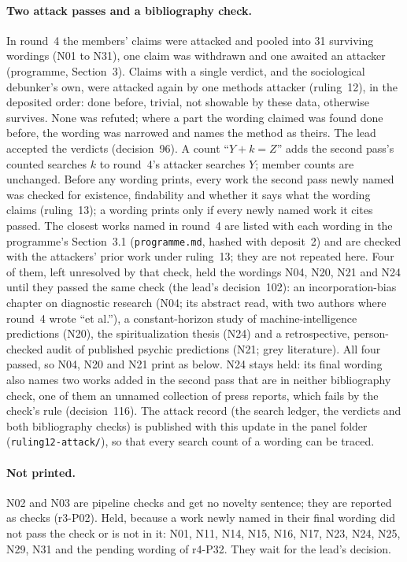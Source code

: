 \paragraph{Two attack passes and a bibliography check.} In round~4 the members' claims were attacked and pooled into 31
surviving wordings (N01 to N31), one claim was withdrawn and one awaited an attacker (programme, Section~3). Claims with
a single verdict, and the sociological debunker's own, were attacked again by one methods attacker (ruling~12), in the
deposited order: done before, trivial, not showable by these data, otherwise survives. None was refuted; where a part
the wording claimed was found done before, the wording was narrowed and names the method as theirs. The lead accepted
the verdicts (decision~96). A count ``$Y + k = Z$'' adds the second pass's counted searches $k$ to round~4's attacker
searches $Y$; member counts are unchanged. Before any wording prints, every work the second pass newly named was checked
for existence, findability and whether it says what the wording claims (ruling~13); a wording prints only if every newly
named work it cites passed. The closest works named in round~4 are listed with each wording in the programme's
Section~3.1 (\texttt{programme.md}, hashed with deposit~2) and are checked with the attackers' prior work under
ruling~13; they are not repeated here. Four of
them, left unresolved by that check, held the wordings N04, N20, N21 and N24 until they passed the same check (the lead's
decision~102): an incorporation-bias chapter on diagnostic research (N04; its abstract read, with two authors where
round~4 wrote ``et al.''), a constant-horizon study of machine-intelligence predictions (N20), the spiritualization
thesis (N24) and a retrospective, person-checked audit of published psychic predictions (N21; grey literature). All four
passed, so N04, N20 and N21 print as below. N24 stays held: its final wording also names two works added in the second
pass that are in neither bibliography check, one of them an unnamed collection of press reports, which fails by the
check's rule (decision~116). The attack record (the search ledger, the verdicts and both bibliography
checks) is published with this update in the panel folder (\texttt{ruling12-attack/}), so that every search count of a
wording can be traced.

\paragraph{Not printed.} N02 and N03 are pipeline checks and get no novelty sentence; they are reported as checks
(r3-P02). Held, because a work newly named in their final wording did not pass the check or is not in it: N01, N11,
N14, N15, N16, N17, N23, N24, N25, N29, N31 and the pending wording of r4-P32. They wait for the lead's decision.

